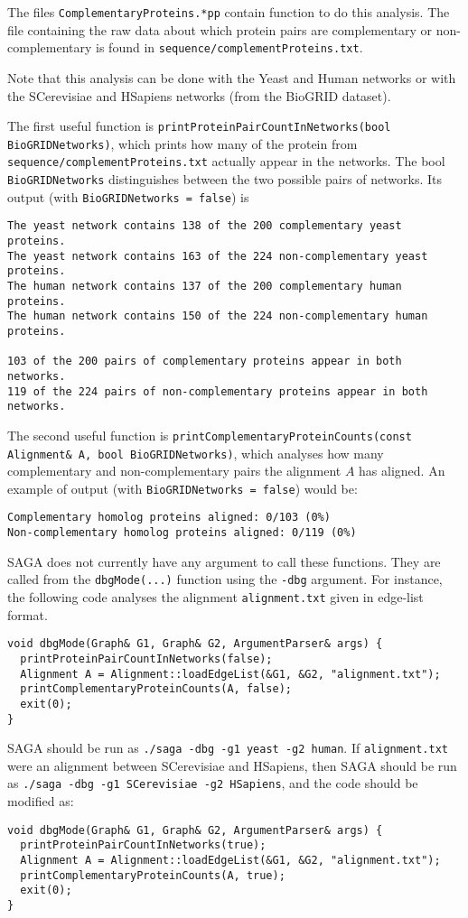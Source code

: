\documentclass[]{article}
\begin{document}
The files \texttt{ComplementaryProteins.*pp} contain function to do this analysis. The file containing the raw data about which protein pairs are complementary or non-complementary is found in \texttt{sequence/complementProteins.txt}.

Note that this analysis can be done with the Yeast and Human networks or with the SCerevisiae and HSapiens networks (from the BioGRID dataset).

The first useful function is \texttt{printProteinPairCountInNetworks(bool BioGRIDNetworks)}, which prints how many of the protein from \texttt{sequence/complementProteins.txt} actually appear in the networks. The bool \texttt{BioGRIDNetworks} distinguishes between the two possible pairs of networks. Its output (with \texttt{BioGRIDNetworks = false}) is
\begin{verbatim}
The yeast network contains 138 of the 200 complementary yeast proteins.
The yeast network contains 163 of the 224 non-complementary yeast proteins.
The human network contains 137 of the 200 complementary human proteins.
The human network contains 150 of the 224 non-complementary human proteins.

103 of the 200 pairs of complementary proteins appear in both networks.
119 of the 224 pairs of non-complementary proteins appear in both networks.
\end{verbatim}
The second useful function is \texttt{printComplementaryProteinCounts(const Alignment\& A, bool BioGRIDNetworks)}, which analyses how many complementary and non-complementary pairs the alignment $A$ has aligned. An example of output (with \texttt{BioGRIDNetworks = false}) would be:
\begin{verbatim}
Complementary homolog proteins aligned: 0/103 (0%)
Non-complementary homolog proteins aligned: 0/119 (0%)
\end{verbatim}

SAGA does not currently have any argument to call these functions. They are called from the \texttt{dbgMode(...)} function using the \texttt{-dbg} argument. For instance, the following code analyses the alignment \texttt{alignment.txt} given in edge-list format.
\begin{verbatim}
void dbgMode(Graph& G1, Graph& G2, ArgumentParser& args) {
  printProteinPairCountInNetworks(false);
  Alignment A = Alignment::loadEdgeList(&G1, &G2, "alignment.txt");
  printComplementaryProteinCounts(A, false);
  exit(0);
}
\end{verbatim}
SAGA should be run as \texttt{./saga -dbg -g1 yeast -g2 human}. If \texttt{alignment.txt} were an alignment between SCerevisiae and HSapiens, then SAGA should be run as \texttt{./saga -dbg -g1 SCerevisiae -g2 HSapiens}, and the code should be modified as:
\begin{verbatim}
void dbgMode(Graph& G1, Graph& G2, ArgumentParser& args) {
  printProteinPairCountInNetworks(true);
  Alignment A = Alignment::loadEdgeList(&G1, &G2, "alignment.txt");
  printComplementaryProteinCounts(A, true);
  exit(0);
}
\end{verbatim}
\end{document}
